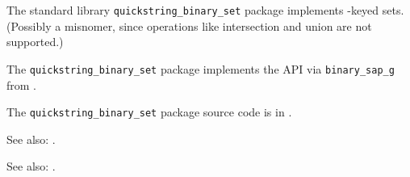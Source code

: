 
The standard library {\tt quickstring\_binary\_set} package implements 
-keyed sets.  (Possibly a misnomer, 
since operations like intersection and union are not supported.)

The {\tt quickstring\_binary\_set} package implements the  API 
via {\tt binary\_sap\_g} from 
.

The {\tt quickstring\_binary\_set} package source code is in .

See also: .

See also: .
